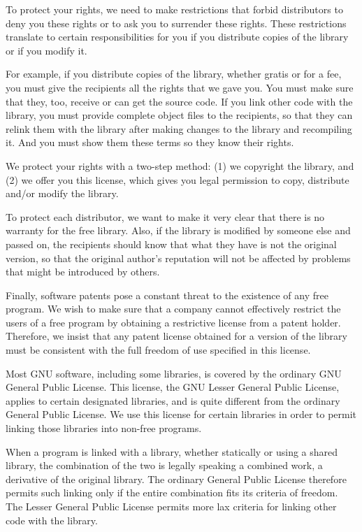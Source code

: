 \documentclass[12pt]{report}
\begin{document}
To protect your rights, we need to make restrictions that forbid
distributors to deny you these rights or to ask you to surrender these
rights.  These restrictions translate to certain responsibilities for you
if you distribute copies of the library or if you modify it.

For example, if you distribute copies of the library, whether gratis or
for a fee, you must give the recipients all the rights that we gave you.
You must make sure that they, too, receive or can get the source code.  If
you link other code with the library, you must provide complete object
files to the recipients, so that they can relink them with the library
after making changes to the library and recompiling it.  And you must show
them these terms so they know their rights.

We protect your rights with a two-step method: (1) we copyright the
library, and (2) we offer you this license, which gives you legal
permission to copy, distribute and/or modify the library.

To protect each distributor, we want to make it very clear that there is
no warranty for the free library.  Also, if the library is modified by
someone else and passed on, the recipients should know that what they have
is not the original version, so that the original author's reputation will
not be affected by problems that might be introduced by others.

Finally, software patents pose a constant threat to the existence of any
free program.  We wish to make sure that a company cannot effectively
restrict the users of a free program by obtaining a restrictive license
from a patent holder.  Therefore, we insist that any patent license
obtained for a version of the library must be consistent with the full
freedom of use specified in this license.

Most GNU software, including some libraries, is covered by the ordinary
GNU General Public License.  This license, the GNU Lesser General Public
License, applies to certain designated libraries, and is quite different
from the ordinary General Public License.  We use this license for certain
libraries in order to permit linking those libraries into non-free
programs.

When a program is linked with a library, whether statically or using a
shared library, the combination of the two is legally speaking a combined
work, a derivative of the original library.  The ordinary General Public
License therefore permits such linking only if the entire combination fits
its criteria of freedom.  The Lesser General Public License permits more
lax criteria for linking other code with the library.
\end{document}

